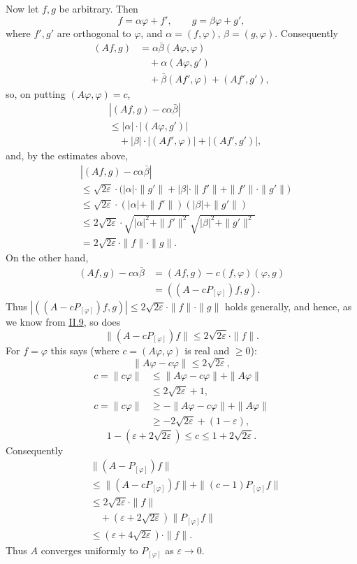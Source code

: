 \documentclass[fontsize=13pt,twoside,openany,headings=normal,parskip=false,bookmarkpackage=false,DIV=calc]{scrbook}
\begin{document}
Now let $f,g$ be arbitrary. Then
\[
f=\alpha\varphi+f',\qquad g=\beta\varphi+g',
\]
where $f',g'$ are orthogonal to $\varphi$, and $\alpha=(f,\varphi)$, $\beta=(g,\varphi)$. Consequently
\begin{align*}
(Af,g)&=\alpha\bar\beta(A\varphi,\varphi)\\
&\quad+\alpha(A\varphi,g')\\
&\quad+\bar\beta(Af',\varphi)+(Af',g'),
\end{align*}
so, on putting $(A\varphi,\varphi)=c$,
\begin{align*}
&|(Af,g)-c\alpha\bar\beta|\\
&\leq|\alpha|\cdot|(A\varphi,g')|\\
&\quad+|\beta|\cdot|(Af',\varphi)|+|(Af',g')|,
\end{align*}
and, by the estimates above,
\begin{align*}
&|(Af,g)-c\alpha\bar\beta|\\
&\leq\sqrt{2\varepsilon}\cdot
\bigl(|\alpha|\cdot\|g'\|+|\beta|\cdot\|f'\|+\|f'\|\cdot\|g'\|\bigr)\\
&\leq\sqrt{2\varepsilon}\cdot(|\alpha|+\|f'\|)(|\beta|+\|g'\|)\\
&\leq2\sqrt{2\varepsilon}\cdot
\sqrt{|\alpha|^2+\|f'\|^2}\sqrt{|\beta|^2+\|g'\|^2}\\
&=2\sqrt{2\varepsilon}\cdot\|f\|\cdot\|g\|.
\end{align*}
On the other hand,
\begin{align*}
(Af,g)-c\alpha\bar\beta
&=(Af,g)-c(f,\varphi)(\varphi,g)\\
&=((A-cP_{[\varphi]})f,g).
\end{align*}
Thus $|((A-cP_{[\varphi]})f,g)|\leq2\sqrt{2\varepsilon}\cdot\|f\|\cdot\|g\|$ holds generally, and hence, as we know from \hyperref[sec:II.9]{II.9}, so does
\hypertarget{origpage-100}{}%
\[
\|(A-cP_{[\varphi]})f\|\leq2\sqrt{2\varepsilon}\cdot\|f\|.
\]
For $f=\varphi$ this says (where $c=(A\varphi,\varphi)$ is real and $\geq0$):
\[
\|A\varphi-c\varphi\|\leq2\sqrt{2\varepsilon},
\]
\begin{align*}
c=\|c\varphi\|&\leq\|A\varphi-c\varphi\|+\|A\varphi\|\\
&\leq2\sqrt{2\varepsilon}+1,\\
c=\|c\varphi\|&\geq-\|A\varphi-c\varphi\|+\|A\varphi\|\\
&\geq-2\sqrt{2\varepsilon}+(1-\varepsilon),
\end{align*}
\[
1-(\varepsilon+2\sqrt{2\varepsilon})\leq c\leq1+2\sqrt{2\varepsilon}.
\]
Consequently
\begin{align*}
&\|(A-P_{[\varphi]})f\|\\
&\leq\|(A-cP_{[\varphi]})f\|+\|(c-1)P_{[\varphi]}f\|\\
&\leq2\sqrt{2\varepsilon}\cdot\|f\|\\
&\quad+(\varepsilon+2\sqrt{2\varepsilon})\|P_{[\varphi]}f\|\\
&\leq(\varepsilon+4\sqrt{2\varepsilon})\cdot\|f\|.
\end{align*}
Thus $A$ converges uniformly to $P_{[\varphi]}$ as $\varepsilon\to0$.
\end{document}
